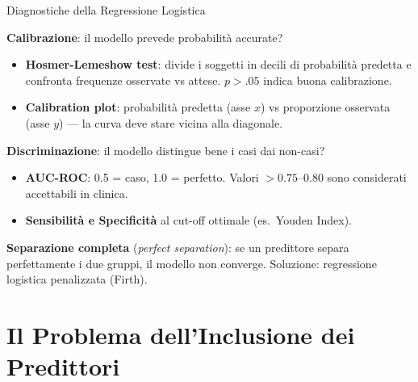 \documentclass[
  ignorenonframetext,
]{beamer}
\begin{document}
\begin{frame}{Diagnostiche della Regressione Logistica}
\label{diagnostiche-della-regressione-logistica}
\small

\textbf{Calibrazione}: il modello prevede probabilità accurate?

\begin{itemize}\footnotesize
\item \textbf{Hosmer-Lemeshow test}: divide i soggetti in decili di probabilità predetta e confronta frequenze osservate vs attese. $p > .05$ indica buona calibrazione.
\item \textbf{Calibration plot}: probabilità predetta (asse $x$) vs proporzione osservata (asse $y$) --- la curva deve stare vicina alla diagonale.
\end{itemize}

\vspace{0.3em}

\textbf{Discriminazione}: il modello distingue bene i casi dai non-casi?

\begin{itemize}\footnotesize
\item \textbf{AUC-ROC}: 0.5 = caso, 1.0 = perfetto. Valori $> 0.75$--$0.80$ sono considerati accettabili in clinica.
\item \textbf{Sensibilità e Specificità} al cut-off ottimale (es.\ Youden Index).
\end{itemize}

\vspace{0.3em}

\textbf{Separazione completa} (\emph{perfect separation}): se un
predittore separa perfettamente i due gruppi, il modello non converge.
Soluzione: regressione logistica penalizzata (Firth).
\end{frame}

\section{Il Problema dell'Inclusione dei
Predittori}\label{il-problema-dellinclusione-dei-predittori}
\end{document}
